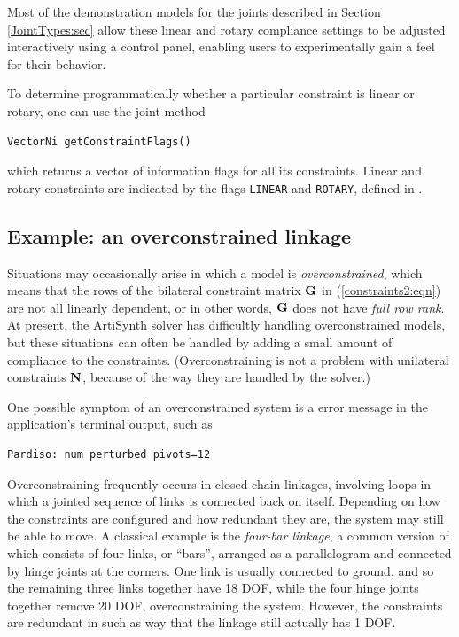 Most of the demonstration models for the joints described in
Section \ref{JointTypes:sec} allow these linear and rotary compliance
settings to be adjusted interactively using a control panel, enabling
users to experimentally gain a feel for their behavior.

To determine programmatically whether a particular constraint is linear
or rotary, one can use the joint method
\begin{lstlisting}[]
  VectorNi getConstraintFlags()
\end{lstlisting}
%
which returns a vector of information flags for all its constraints.
Linear and rotary constraints are indicated by the flags {\tt LINEAR}
and {\tt ROTARY}, defined in 
.

\subsection{Example: an overconstrained linkage}
\label{FourBar:sec}

Situations may occasionally arise in which a model is {\it
overconstrained}, which means that the rows of the bilateral
constraint matrix ${\bf G}$ in (\ref{constraints2:eqn}) are not all
linearly dependent, or in other words, ${\bf G}$ does not have {\it full
row rank}. At present, the ArtiSynth solver has difficultly handling
overconstrained models, but these situations can often be handled by
adding a small amount of compliance to the
constraints. (Overconstraining is not a problem with unilateral
constraints ${\bf N}$, because of the way they are handled by the solver.)

One possible symptom of an overconstrained system is a error message
in the application's terminal output, such as
%
\begin{verbatim}
Pardiso: num perturbed pivots=12
\end{verbatim}

Overconstraining frequently occurs in closed-chain linkages, involving
loops in which a jointed sequence of links is connected back on
itself. Depending on how the constraints are configured and how
redundant they are, the system may still be able to move.  A classical
example is the {\it four-bar linkage}, a common version of which
consists of four links, or ``bars'', arranged as a parallelogram and
connected by hinge joints at the corners. One link is usually
connected to ground, and so the remaining three links together have 18
DOF, while the four hinge joints together remove 20 DOF,
overconstraining the system. However, the constraints are redundant in
such as way that the linkage still actually has 1 DOF.

